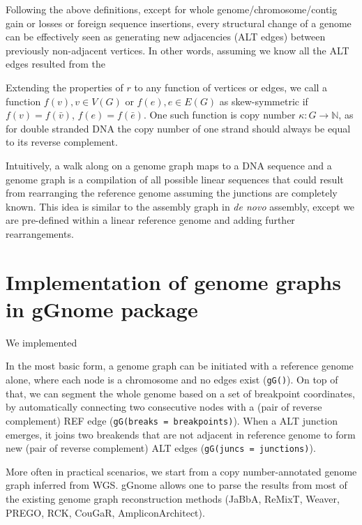 \documentclass[phd,tocprelim]{cornell}
\begin{document}
% 
Following the above definitions, except for whole genome/chromosome/contig gain or losses or foreign sequence insertions, every structural change of a genome can be effectively seen as generating new adjacencies (ALT edges) between previously non-adjacent vertices. In other words, assuming we know all the ALT edges resulted from the 



Extending the properties of $r$ to any function of vertices or edges, we call a function $f(v), v \in V(G)$ or $f(e), e \in E(G)$ as skew-symmetric if $f(v) = f(\bar{v})$, $f(e)=f(\bar{e})$. One such function is copy number $\kappa : G \rightarrow \mathbb{N}$, as for double stranded DNA the copy number of one strand should always be equal to its reverse complement.

Intuitively, a walk along on a genome graph maps to a DNA sequence and a genome graph is a compilation of all possible linear sequences that could result from rearranging the reference genome assuming the junctions are completely known. This idea is similar to the assembly graph in \textit{de novo} assembly, except we are pre-defined within a linear reference genome and adding further rearrangements.

\section{Implementation of genome graphs in gGnome package}
We implemented 

In the most basic form, a genome graph can be initiated with a reference genome alone, where each node is a chromosome and no edges exist (\texttt{gG()}). On top of that, we can segment the whole genome based on a set of breakpoint coordinates, by automatically connecting two consecutive nodes with a (pair of reverse complement) REF edge (\texttt{gG(breaks = breakpoints)}). When a ALT junction emerges, it joins two breakends that are not adjacent in reference genome to form new (pair of reverse complement) ALT edges (\texttt{gG(juncs = junctions)}).

More often in practical scenarios, we start from a copy number-annotated genome graph inferred from WGS. gGnome allows one to parse the results from most of the existing genome graph reconstruction methods (JaBbA, ReMixT, Weaver, PREGO, RCK, CouGaR, AmpliconArchitect). 
\end{document}
